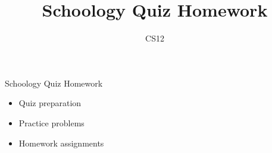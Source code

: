 \documentclass{beamer}
\title{Schoology Quiz Homework}
\author{CS12}
\date{}
\begin{document}
\begin{frame}
    \titlepage
\end{frame}

\begin{frame}{Schoology Quiz Homework}
    \begin{itemize}
        \item Quiz preparation
        \item Practice problems
        \item Homework assignments
    \end{itemize}
\end{frame}
\end{document}
